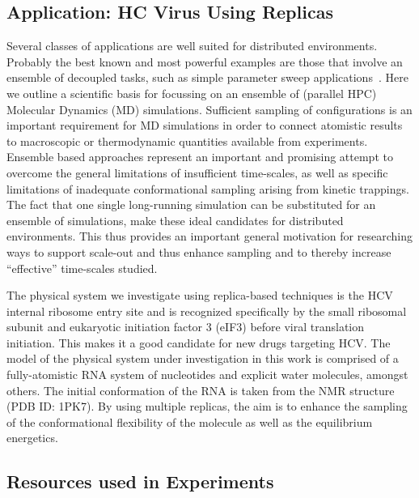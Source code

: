 \documentclass[conference,final]{IEEEtran}
\newcommand{\up}{\vspace*{-1em}}
\newcommand{\jhanote}[1]{ {\textcolor{red} { ***SJ: #1 }}}
\newcommand{\jhanote}[1]{}
\begin{document}
\subsection{Application: HC Virus Using Replicas}

Several classes of applications are well suited for distributed
environments. Probably the best known and most powerful examples are
those that involve an ensemble of decoupled tasks, such as simple
parameter sweep applications~\cite{1239909}. Here we outline a
scientific basis for focussing on an ensemble of (parallel HPC)
Molecular Dynamics (MD) simulations.  Sufficient sampling of
configurations is an important requirement for MD simulations in order
to connect atomistic results to macroscopic or thermodynamic
quantities available from experiments.  Ensemble based approaches
represent an important and promising attempt to overcome the general
limitations of insufficient time-scales, as well as specific
limitations of inadequate conformational sampling arising from kinetic
trappings.  The fact that one single long-running simulation can be
substituted for an ensemble of simulations, make these ideal
candidates for distributed environments.  This thus provides an
important general motivation for researching ways to support scale-out
and thus enhance sampling and to thereby increase ``effective''
time-scales studied.

The physical system we investigate using replica-based techniques is
the HCV internal ribosome entry site and is recognized specifically by
the small ribosomal subunit and eukaryotic initiation factor 3 (eIF3)
before viral translation initiation.  This makes it a good candidate
for new drugs targeting HCV.  The model of the physical system under
investigation in this work is comprised of a fully-atomistic RNA
system of nucleotides and explicit water molecules, amongst
others. The initial conformation of the RNA is taken from the NMR
structure (PDB ID: 1PK7).  By using multiple replicas, the aim is to
enhance the sampling of the conformational flexibility of the molecule
as well as the equilibrium energetics.



\subsection{Resources used in Experiments}
\up 
\end{document}
